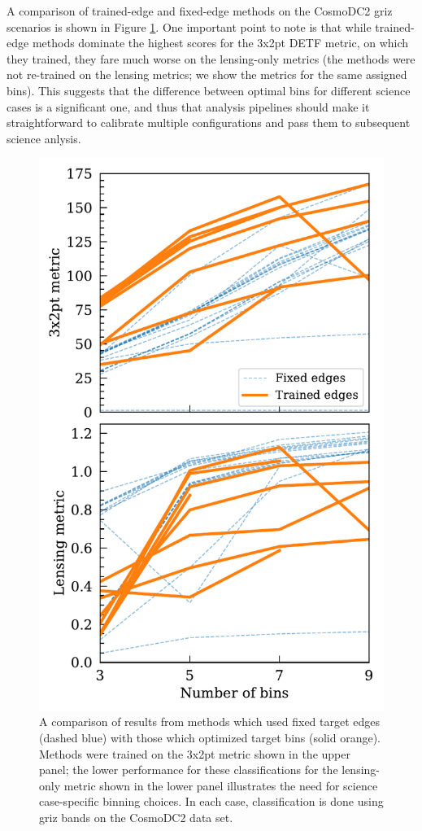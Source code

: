 \documentclass[twocolumn,twocolappendix]{aastex63}
\begin{document}
A comparison of trained-edge and fixed-edge methods on the CosmoDC2 griz scenarios
is shown in Figure \ref{fig:edges}.  One important point to note is that while trained-edge
methods dominate the highest scores for the 3x2pt DETF metric, on which they trained, they
fare much worse on the lensing-only metrics (the methods were not re-trained on the lensing metrics;
we show the metrics for the same assigned bins).  This suggests that the difference between
optimal bins for different science cases is a significant one, and thus that analysis pipelines
should make it straightforward to calibrate multiple configurations and pass them to
subsequent science anlysis.

\begin{figure}
\includegraphics[width=0.9\columnwidth]{results/edge_comparison.pdf}
\caption{A comparison of results from methods which used fixed target edges (dashed blue)
with those which optimized target bins (solid orange).  Methods were trained on the 3x2pt metric
shown in the upper panel; the lower performance for these classifications 
for the lensing-only metric shown in the lower panel illustrates the need for science case-specific
binning choices. In each case, classification is done using griz bands on the CosmoDC2 data set.}
\label{fig:edges}
\end{figure}
\end{document}
